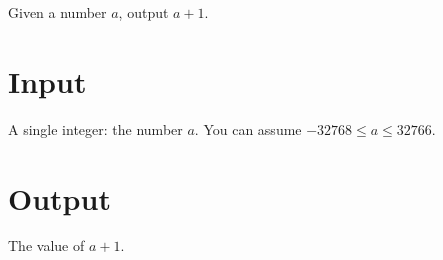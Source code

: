 Given a number $a$, output $a+1$.

\section*{Input}

A single integer: the number $a$.
You can assume $-32768\leq a\leq 32766$.

\section*{Output}

The value of $a+1$.
